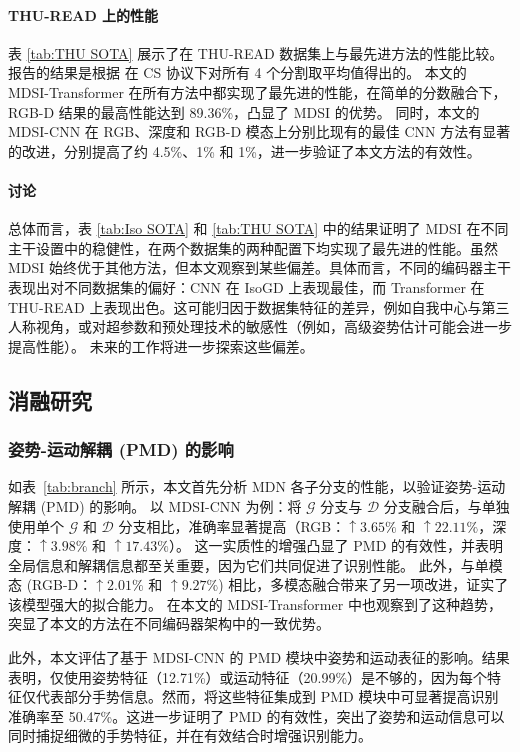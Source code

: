 \paragraph{THU-READ 上的性能}
表 \ref{tab:THU SOTA} 展示了在 THU-READ 数据集上与最先进方法的性能比较。报告的结果是根据 \cite{tang2018multi} 在 CS 协议下对所有 4 个分割取平均值得出的。
本文的 MDSI-Transformer 在所有方法中都实现了最先进的性能，在简单的分数融合下，RGB-D 结果的最高性能达到 89.36\%，凸显了 MDSI 的优势。
同时，本文的 MDSI-CNN 在 RGB、深度和 RGB-D 模态上分别比现有的最佳 CNN 方法有显著的改进，分别提高了约 4.5\%、1\% 和 1\%，进一步验证了本文方法的有效性。

\paragraph{讨论}
总体而言，表 \ref{tab:Iso SOTA} 和 \ref{tab:THU SOTA} 中的结果证明了 MDSI 在不同主干设置中的稳健性，在两个数据集的两种配置下均实现了最先进的性能。虽然 MDSI 始终优于其他方法，但本文观察到某些偏差。具体而言，不同的编码器主干表现出对不同数据集的偏好：CNN 在 IsoGD 上表现最佳，而 Transformer 在 THU-READ 上表现出色。这可能归因于数据集特征的差异，例如自我中心与第三人称视角，或对超参数和预处理技术的敏感性（例如，高级姿势估计可能会进一步提高性能）。
未来的工作将进一步探索这些偏差。

\subsection{消融研究}
\subsubsection{姿势-运动解耦 (PMD) 的影响}
如表~\ref{tab:branch} 所示，本文首先分析 MDN 各子分支的性能，以验证姿势-运动解耦 (PMD) 的影响。
以 MDSI-CNN 为例：将 $\mathcal{G}$ 分支与 $\mathcal{D}$ 分支融合后，与单独使用单个 $\mathcal{G}$ 和 $\mathcal{D}$ 分支相比，准确率显著提高（RGB：$\uparrow3.65\%$ 和 $\uparrow22.11\%$，深度：$\uparrow3.98\%$ 和 $\uparrow17.43\%$）。
这一实质性的增强凸显了 PMD 的有效性，并表明全局信息和解耦信息都至关重要，因为它们共同促进了识别性能。
此外，与单模态 (RGB-D：$\uparrow2.01\%$ 和 $\uparrow9.27\%$) 相比，多模态融合带来了另一项改进，证实了该模型强大的拟合能力。
在本文的 MDSI-Transformer 中也观察到了这种趋势，突显了本文的方法在不同编码器架构中的一致优势。

此外，本文评估了基于 MDSI-CNN 的 PMD 模块中姿势和运动表征的影响。结果表明，仅使用姿势特征（12.71\%）或运动特征（20.99\%）是不够的，因为每个特征仅代表部分手势信息。然而，将这些特征集成到 PMD 模块中可显著提高识别准确率至 50.47\%。这进一步证明了 PMD 的有效性，突出了姿势和运动信息可以同时捕捉细微的手势特征，并在有效结合时增强识别能力。

